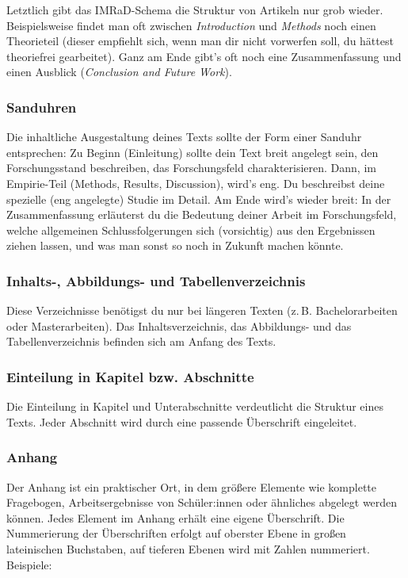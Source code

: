 \documentclass{../cssheet}
\begin{document}
Letztlich gibt das IMRaD-Schema die Struktur von Artikeln nur grob
wieder. Beispielsweise findet man oft zwischen \emph{Introduction} und
\emph{Methods} noch einen Theorieteil (dieser empfiehlt sich, wenn man dir
nicht vorwerfen soll, du hättest theoriefrei gearbeitet). Ganz am Ende
gibt's oft noch eine Zusammenfassung und einen Ausblick (\emph{Conclusion and
Future Work}).

\subsubsection*{Sanduhren}

Die inhaltliche Ausgestaltung deines Texts sollte der Form einer Sanduhr
entsprechen: Zu Beginn (Einleitung) sollte dein Text breit angelegt
sein, den Forschungsstand beschreiben, das Forschungsfeld
charakterisieren. Dann, im Empirie-Teil (Methods, Results, Discussion),
wird's eng. Du beschreibst deine spezielle (eng angelegte) Studie im
Detail. Am Ende wird's wieder breit: In der Zusammenfassung erläuterst
du die Bedeutung deiner Arbeit im Forschungsfeld, welche allgemeinen
Schlussfolgerungen sich (vorsichtig) aus den Ergebnissen ziehen lassen,
und was man sonst so noch in Zukunft machen könnte.

\subsubsection*{Inhalts-, Abbildungs- und Tabellenverzeichnis}

Diese Verzeichnisse benötigst du nur bei längeren Texten (z.\,B.
Bachelorarbeiten oder Masterarbeiten). Das Inhaltsverzeichnis, das
Abbildungs- und das Tabellenverzeichnis befinden sich am Anfang des
Texts.

\subsubsection*{Einteilung in Kapitel bzw. Abschnitte}

Die Einteilung in Kapitel und Unterabschnitte verdeutlicht die Struktur
eines Texts. Jeder Abschnitt wird durch eine passende Überschrift
eingeleitet.

\subsubsection*{Anhang}

Der Anhang ist ein praktischer Ort, in dem größere Elemente wie
komplette Fragebogen, Arbeitsergebnisse von Schüler:innen oder ähnliches
abgelegt werden können. Jedes Element im Anhang erhält eine eigene
Überschrift. Die Nummerierung der Überschriften erfolgt auf oberster
Ebene in großen lateinischen Buchstaben, auf tieferen Ebenen wird mit
Zahlen nummeriert. Beispiele:
\end{document}

